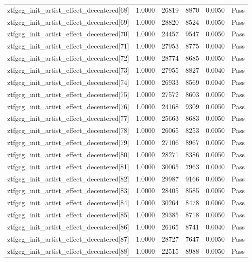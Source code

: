 \begin{table}[htbp]
\begin{tabular}{llrrll}
ztfgcg\_init\_artist\_effect\_decentered[68] & 1.0000 & 26819 & 8870 & 0.0050 & Pass \\
ztfgcg\_init\_artist\_effect\_decentered[69] & 1.0000 & 28820 & 8524 & 0.0050 & Pass \\
ztfgcg\_init\_artist\_effect\_decentered[70] & 1.0000 & 24457 & 9547 & 0.0050 & Pass \\
ztfgcg\_init\_artist\_effect\_decentered[71] & 1.0000 & 27953 & 8775 & 0.0040 & Pass \\
ztfgcg\_init\_artist\_effect\_decentered[72] & 1.0000 & 28774 & 8685 & 0.0050 & Pass \\
ztfgcg\_init\_artist\_effect\_decentered[73] & 1.0000 & 27955 & 8827 & 0.0040 & Pass \\
ztfgcg\_init\_artist\_effect\_decentered[74] & 1.0000 & 26933 & 8569 & 0.0040 & Pass \\
ztfgcg\_init\_artist\_effect\_decentered[75] & 1.0000 & 27572 & 8603 & 0.0050 & Pass \\
ztfgcg\_init\_artist\_effect\_decentered[76] & 1.0000 & 24168 & 9309 & 0.0050 & Pass \\
ztfgcg\_init\_artist\_effect\_decentered[77] & 1.0000 & 25663 & 8683 & 0.0050 & Pass \\
ztfgcg\_init\_artist\_effect\_decentered[78] & 1.0000 & 26065 & 8253 & 0.0050 & Pass \\
ztfgcg\_init\_artist\_effect\_decentered[79] & 1.0000 & 27106 & 8967 & 0.0050 & Pass \\
ztfgcg\_init\_artist\_effect\_decentered[80] & 1.0000 & 28271 & 8386 & 0.0050 & Pass \\
ztfgcg\_init\_artist\_effect\_decentered[81] & 1.0000 & 30065 & 7963 & 0.0040 & Pass \\
ztfgcg\_init\_artist\_effect\_decentered[82] & 1.0000 & 29987 & 9166 & 0.0050 & Pass \\
ztfgcg\_init\_artist\_effect\_decentered[83] & 1.0000 & 28405 & 8585 & 0.0050 & Pass \\
ztfgcg\_init\_artist\_effect\_decentered[84] & 1.0000 & 30264 & 8478 & 0.0060 & Pass \\
ztfgcg\_init\_artist\_effect\_decentered[85] & 1.0000 & 29385 & 8718 & 0.0050 & Pass \\
ztfgcg\_init\_artist\_effect\_decentered[86] & 1.0000 & 26165 & 8741 & 0.0040 & Pass \\
ztfgcg\_init\_artist\_effect\_decentered[87] & 1.0000 & 28727 & 7647 & 0.0050 & Pass \\
ztfgcg\_init\_artist\_effect\_decentered[88] & 1.0000 & 22515 & 8988 & 0.0050 & Pass \\

\end{tabular}
\end{table}
